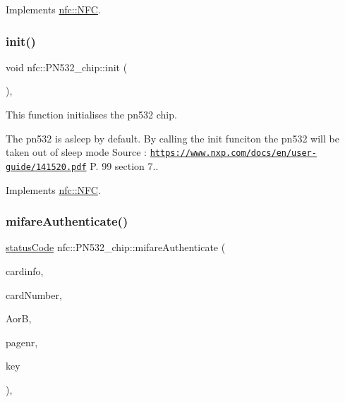 Implements \hyperlink{classnfc_1_1NFC_a4ee83726542bf5f25eacb9feaccefd28}{nfc\+::\+N\+FC}.

\mbox{\label{classnfc_1_1PN532__chip_ab2eecf84902eedff7e7b5fae0c562804}} 
\subsubsection{\texorpdfstring{init()}{init()}}
{\footnotesize\ttfamily void nfc\+::\+P\+N532\+\_\+chip\+::init (\begin{DoxyParamCaption}{ }\end{DoxyParamCaption})\hspace{0.3cm}{\ttfamily [override]}, {\ttfamily [virtual]}}



This function initialises the pn532 chip. 

The pn532 is asleep by default. By calling the init funciton the pn532 will be taken out of sleep mode Source \+: \href{https://www.nxp.com/docs/en/user-guide/141520.pdf}{\tt https\+://www.\+nxp.\+com/docs/en/user-\/guide/141520.\+pdf} P. 99 section 7.. 

Implements \hyperlink{classnfc_1_1NFC_a9893c1b762ed0c6796afcde7733bd8cc}{nfc\+::\+N\+FC}.

\mbox{\label{classnfc_1_1PN532__chip_a9737b9cf574ec198bcc0f9f42f50d882}} 
\subsubsection{\texorpdfstring{mifare\+Authenticate()}{mifareAuthenticate()}}
{\footnotesize\ttfamily \hyperlink{declarations_8h_ae1d20c5a38cae82ccaa6a77be3fd264b}{status\+Code} nfc\+::\+P\+N532\+\_\+chip\+::mifare\+Authenticate (\begin{DoxyParamCaption}\item[{\hyperlink{classcard}{card} \&}]{cardinfo,  }\item[{const uint8\+\_\+t}]{card\+Number,  }\item[{const \hyperlink{declarations_8h_a305b1a3bcfca65e2a82f0f9d24676835}{mifare\+Commands}}]{AorB,  }\item[{const uint8\+\_\+t}]{pagenr,  }\item[{const uint8\+\_\+t $\ast$}]{key }\end{DoxyParamCaption})\hspace{0.3cm}{\ttfamily [override]}, {\ttfamily [virtual]}}



